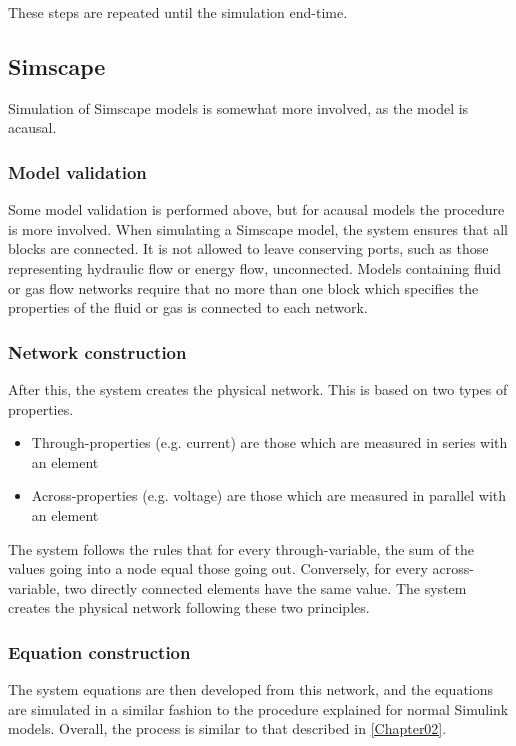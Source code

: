 \documentclass[\rootfolder/main.tex]{subfiles}
\begin{document}
These steps are repeated until the simulation end-time.

\subsection{Simscape}

Simulation of Simscape models is somewhat more involved, as the model is acausal.

\subsubsection{Model validation}

Some model validation is performed above, but for acausal models the procedure is more involved.
When simulating a Simscape model, the system ensures that all blocks are connected.
It is not allowed to leave conserving ports, such as those representing hydraulic flow or energy flow, unconnected.
Models containing fluid or gas flow networks require that no more than one block which specifies the properties of the fluid or gas is connected to each network.

\subsubsection{Network construction}

After this, the system creates the physical network.
This is based on two types of properties.

\begin{itemize}
    \item Through-properties (e.g. current) are those which are measured in series with an element
    \item Across-properties (e.g. voltage) are those which are measured in parallel with an element
\end{itemize}

The system follows the rules that for every through-variable, the sum of the values going into a node equal those going out.
Conversely, for every across-variable, two directly connected elements have the same value.
The system creates the physical network following these two principles.

\subsubsection{Equation construction}

The system equations are then developed from this network, and the equations are simulated in a similar fashion to the procedure explained for normal Simulink models.
Overall, the process is similar to that described in \cref{Chapter02}.
\end{document}
